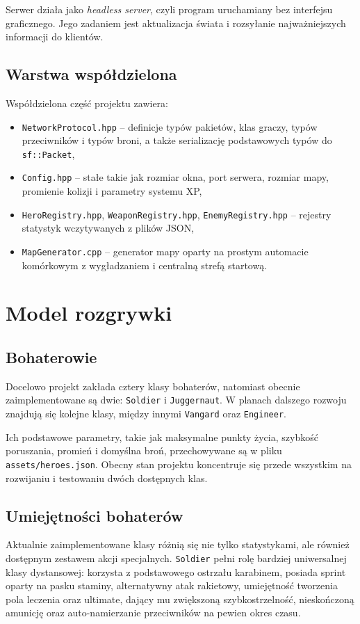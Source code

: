 \documentclass[a4paper,12pt]{article}
\begin{document}
Serwer działa jako \textit{headless server}, czyli program uruchamiany bez interfejsu graficznego. Jego zadaniem jest aktualizacja świata i rozsyłanie najważniejszych informacji do klientów.

\subsection{Warstwa współdzielona}
Współdzielona część projektu zawiera:
\begin{itemize}[leftmargin=1.5cm]
    \item \texttt{NetworkProtocol.hpp} -- definicje typów pakietów, klas graczy, typów przeciwników i typów broni, a także serializację podstawowych typów do \texttt{sf::Packet},
    \item \texttt{Config.hpp} -- stałe takie jak rozmiar okna, port serwera, rozmiar mapy, promienie kolizji i parametry systemu XP,
    \item \texttt{HeroRegistry.hpp}, \texttt{WeaponRegistry.hpp}, \texttt{EnemyRegistry.hpp} -- rejestry statystyk wczytywanych z plików JSON,
    \item \texttt{MapGenerator.cpp} -- generator mapy oparty na prostym automacie komórkowym z wygładzaniem i centralną strefą startową.
\end{itemize}

\section{Model rozgrywki}
\subsection{Bohaterowie}
Docelowo projekt zakłada cztery klasy bohaterów, natomiast obecnie zaimplementowane są dwie: \texttt{Soldier} i \texttt{Juggernaut}. W planach dalszego rozwoju znajdują się kolejne klasy, między innymi \texttt{Vangard} oraz \texttt{Engineer}.

Ich podstawowe parametry, takie jak maksymalne punkty życia, szybkość poruszania, promień i domyślna broń, przechowywane są w pliku \texttt{assets/heroes.json}. Obecny stan projektu koncentruje się przede wszystkim na rozwijaniu i testowaniu dwóch dostępnych klas.

\subsection{Umiejętności bohaterów}
Aktualnie zaimplementowane klasy różnią się nie tylko statystykami, ale również dostępnym zestawem akcji specjalnych. \texttt{Soldier} pełni rolę bardziej uniwersalnej klasy dystansowej: korzysta z podstawowego ostrzału karabinem, posiada sprint oparty na pasku staminy, alternatywny atak rakietowy, umiejętność tworzenia pola leczenia oraz ultimate, dający mu zwiększoną szybkostrzelność, nieskończoną amunicję oraz auto-namierzanie przeciwników na pewien okres czasu.
\end{document}
